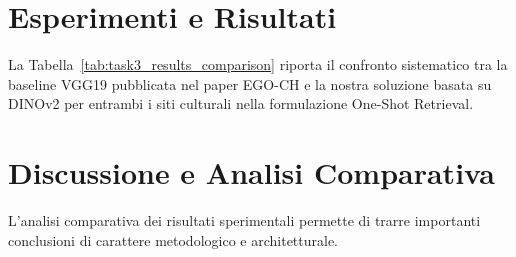\documentclass[a4paper,12pt]{report}
\begin{document}
\section{Esperimenti e Risultati}

La Tabella~\ref{tab:task3_results_comparison} riporta il confronto sistematico tra la baseline VGG19 pubblicata nel paper EGO-CH e la nostra soluzione basata su DINOv2 per entrambi i siti culturali nella formulazione One-Shot Retrieval.

\begin{table}[htbp]
\centering
\caption{Confronto delle performance di One-Shot Retrieval tra la baseline VGG19 del paper EGO-CH~\cite{egoref} e la nostra architettura DINOv2 (\texttt{dinov2\_vits14} + Cosine Similarity).}
\label{tab:task3_results_comparison}
\end{table}

\section{Discussione e Analisi Comparativa}

L'analisi comparativa dei risultati sperimentali permette di trarre importanti conclusioni di carattere metodologico e architetturale.
\end{document}
